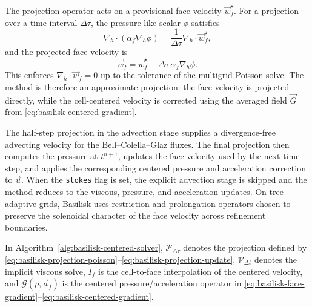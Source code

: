 The projection operator acts on a provisional face velocity \(\vec w_f^\star\).
For a projection over a time interval \(\Delta \tau\), the pressure-like scalar
\(\phi\) satisfies
\begin{equation}
    \nabla_h \cdot \left(\alpha_f \nabla_h \phi\right)
    =
    \frac{1}{\Delta \tau}\nabla_h \cdot \vec w_f^\star,
    \label{eq:basilisk-projection-poisson}
\end{equation}
and the projected face velocity is
\begin{equation}
    \vec w_f
    =
    \vec w_f^\star
    - \Delta \tau\,\alpha_f\nabla_h\phi .
    \label{eq:basilisk-projection-update}
\end{equation}
This enforces \(\nabla_h\cdot\vec w_f=0\) up to the tolerance of the
multigrid Poisson solve. The method is therefore an approximate projection:
the face velocity is projected directly, while the cell-centered velocity is
corrected using the averaged field \(\vec G\) from
\eqref{eq:basilisk-centered-gradient}.

The half-step projection in the advection stage supplies a divergence-free
advecting velocity for the Bell--Colella--Glaz fluxes. The final projection
then computes the pressure at \(t^{n+1}\), updates the face velocity used by
the next time step, and applies the corresponding centered pressure and
acceleration correction to \(\vec u\). When the \texttt{stokes} flag is set,
the explicit advection stage is skipped and the method reduces to the viscous,
pressure, and acceleration updates. On tree-adaptive grids, Basilisk uses
restriction and prolongation operators chosen to preserve the solenoidal
character of the face velocity across refinement boundaries.

In Algorithm~\ref{alg:basilisk-centered-solver}, \(\mathcal P_{\Delta\tau}\)
denotes the projection defined by
\eqref{eq:basilisk-projection-poisson}--\eqref{eq:basilisk-projection-update},
\(\mathcal V_{\Delta t}\) denotes the implicit viscous solve, \(I_f\) is the
cell-to-face interpolation of the centered velocity, and \(\mathcal G(p,\vec
a_f)\) is the centered pressure/acceleration operator in
\eqref{eq:basilisk-face-gradient}--\eqref{eq:basilisk-centered-gradient}.

